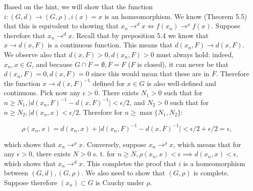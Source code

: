 \begin{solution}
    
    Based on the hint, we will show that the function $i: (G, d) \rightarrow (G, \rho), i(x) = x$ is an homeomorphism.
    We know (Theorem 5.5) that this is equivalent to showing that $x_n \rightarrow^{d} x \iff f(x_n) \rightarrow^{\rho} f(x)$.
    Suppose therefore that $x_n \rightarrow^{d} x$.
    Recall that by preposition 5.4 we know that $x \rightarrow d(x, F)$ is a continuous function.
    This means that $d(x_n, F) \rightarrow d(x, F)$.
    We observe also that $d(x, F) > 0, d(x_n, F) > 0$ must always hold: indeed, $x_n, x \in G$, and because $G \cap F = \emptyset, \overline{F} = F$ ($F$ is closed), it can never be that $d(x_n, F) = 0, d(x, F) = 0$ since this would mean that these are in $\overline{F}$.
    Therefore the function $x \rightarrow d(x, F)^{-1}$ defined for $x \in G$ is also well-defined and continuous.
    Pick now any $\epsilon > 0$.
    There exists $N_1 > 0$ such that for $n \geq N_1, \lvert d(x_n, F)^{-1} - d(x, F)^{-1} \rvert < \epsilon/2$, and $N_2 > 0$ such that for $n \geq N_2, \lvert d(x_n, x) < \epsilon/2$.
    Therefore for $n \geq \max\{N_1, N_2\}$:

    \[\rho(x_n, x) = d(x_n, x) + \lvert d(x_n, F)^{-1} - d(x, F)^{-1} \rvert < \epsilon/2 + \epsilon/2 = \epsilon,\]

    which shows that $x_n \rightarrow^{\rho} x$.
    Conversely, suppose $x_n \rightarrow^{\rho} x$, which means that for any $\epsilon > 0$, there exists $N > 0$ s. t. for $n \geq N, \rho(x_n, x) < \epsilon \implies d(x_n, x) < \epsilon$, which shows that $x_n \rightarrow^{d} x$.
    This completes the proof that $i$ is a homeomorphism between $(G, d), (G, \rho)$.
    We also need to show that $(G, \rho)$ is complete.
    Suppose therefore $(x_n) \subset G$ is Cauchy under $\rho$.
\end{solution}